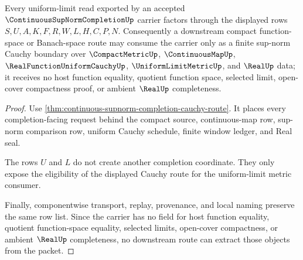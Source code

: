 \begin{theorem}
\label{thm:continuous-supnorm-completion-uniform-limit-seal}
Every uniform-limit read exported by an accepted $\ContinuousSupNormCompletionUp$ carrier factors through the displayed rows $S,U,A,K,F,R,W,L,H,C,P,N$. Consequently a downstream compact function-space or Banach-space route may consume the carrier only as a finite sup-norm Cauchy boundary over $\CompactMetricUp$, $\ContinuousMapUp$, $\RealFunctionUniformCauchyUp$, $\UniformLimitMetricUp$, and $\RealUp$ data; it receives no host function equality, quotient function space, selected limit, open-cover compactness proof, or ambient $\RealUp$ completeness.
\end{theorem}
\begin{proof}
Use \autoref{thm:continuous-supnorm-completion-cauchy-route}. It places every completion-facing request behind the compact source, continuous-map row, sup-norm comparison row, uniform Cauchy schedule, finite window ledger, and Real seal.

The rows $U$ and $L$ do not create another completion coordinate. They only expose the eligibility of the displayed Cauchy route for the uniform-limit metric consumer.

Finally, componentwise transport, replay, provenance, and local naming preserve the same row list. Since the carrier has no field for host function equality, quotient function-space equality, selected limits, open-cover compactness, or ambient $\RealUp$ completeness, no downstream route can extract those objects from the packet.
\end{proof}


